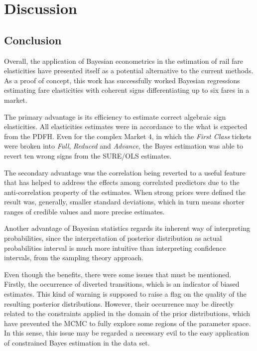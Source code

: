 \chapter{Discussion}

\section{Conclusion}

Overall, the application of Bayesian econometrics in the estimation of rail fare elasticities have presented itself as a potential alternative to the current methods. As a proof of concept, this work has successfully worked Bayesian regressions estimating fare elasticities with coherent signs differentiating up to six fares in a market.

The primary advantage is its efficiency to estimate correct algebraic sign elasticities. All elasticities estimates were in accordance to the what is expected from the PDFH. Even for the complex Market 4, in which the \textit{First Class} tickets were broken into \textit{Full}, \textit{Reduced} and \textit{Advance}, the Bayes estimation was able to revert ten wrong signs from the SURE/OLS estimates.

The secondary advantage was the correlation being reverted to a useful feature that has helped to address the effects among correlated predictors due to the anti-correlation property of the estimates. When strong priors were defined the result was, generally, smaller standard deviations, which in turn means shorter ranges of credible values and more precise estimates.

Another advantage of Bayesian statistics regards its inherent way of interpreting probabilities, since the interpretation of posterior distribution as actual probabilities interval is much more intuitive than interpreting confidence intervals, from the sampling theory approach.

Even though the benefits, there were some issues that must be mentioned. Firstly, the occurrence of diverted transitions, which is an indicator of biased estimates. This kind of warning is supposed to raise a flag on the quality of the resulting posterior distributions. However, their occurrence may be directly related to the constraints applied in the domain of the prior distributions, which have prevented the MCMC to fully explore some regions of the parameter space. In this sense, this issue may be regarded a necessary evil to the easy application of constrained Bayes estimation in the data set.

